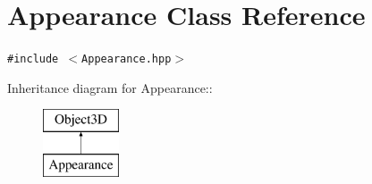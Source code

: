 \hypertarget{classm3g_1_1Appearance}{
\section{Appearance Class Reference}
\label{classm3g_1_1Appearance}
}
{\tt \#include $<$Appearance.hpp$>$}

Inheritance diagram for Appearance::\begin{figure}[H]
\begin{center}
\leavevmode
\includegraphics[height=2cm]{classm3g_1_1Appearance}
\end{center}
\end{figure}
